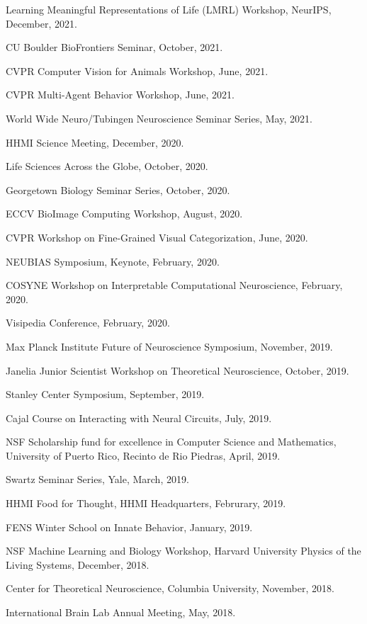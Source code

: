 \documentclass[11pt, letterpaper]{awesome-cv}
\begin{document}
\begin{cvitems}
\item Learning Meaningful Representations of Life (LMRL) Workshop, NeurIPS, December, 2021.
\item CU Boulder BioFrontiers Seminar, October, 2021.  
\item CVPR Computer Vision for Animals Workshop, June, 2021. 
\item CVPR Multi-Agent Behavior Workshop, June, 2021.
\item World Wide Neuro/Tubingen Neuroscience Seminar Series, May, 2021.
\item HHMI Science Meeting, December, 2020.
\item Life Sciences Across the Globe, October, 2020.
\item Georgetown Biology Seminar Series, October, 2020. 
\item ECCV BioImage Computing Workshop, August, 2020. 
\item CVPR Workshop on Fine-Grained Visual Categorization, June, 2020. 
\item NEUBIAS Symposium, Keynote, February, 2020. 
\item COSYNE Workshop on Interpretable Computational Neuroscience, February, 2020. 
\item Visipedia Conference, February, 2020. 
\item Max Planck Institute Future of Neuroscience Symposium, November, 2019.
\item Janelia Junior Scientist Workshop on Theoretical Neuroscience, October, 2019. 
\item Stanley Center Symposium, September, 2019. 
\item Cajal Course on Interacting with Neural Circuits, July, 2019.
\item NSF Scholarship fund for excellence in Computer Science and Mathematics, University of Puerto Rico, Recinto de Rio Piedras, April, 2019.
\item Swartz Seminar Series, Yale, March, 2019.
\item HHMI Food for Thought, HHMI Headquarters, Februrary, 2019.
\item FENS Winter School on Innate Behavior, January, 2019.
\item NSF Machine Learning and Biology Workshop, Harvard University Physics of the Living Systems, December, 2018.
\item Center for Theoretical Neuroscience, Columbia University, November, 2018.
\item International Brain Lab Annual Meeting, May, 2018. 

\end{cvitems}
\end{document}
